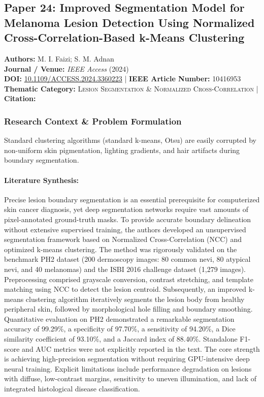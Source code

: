 \subsection{Paper 24: Improved Segmentation Model for Melanoma Lesion Detection Using Normalized Cross-Correlation-Based k-Means Clustering}
\label{sec:paper_24}

\begin{tcolorbox}[colback=gray!5!white,colframe=gray!75!black,title=\textbf{Metadata \& Citation Summary}]
\textbf{Authors:} M. I. Faizi; S. M. Adnan \\
\textbf{Journal / Venue:} \textit{IEEE Access} (2024) \\
\textbf{DOI:} \href{https://doi.org/10.1109/ACCESS.2024.3360223}{10.1109/ACCESS.2024.3360223} \quad | \quad \textbf{IEEE Article Number:} 10416953 \\
\textbf{Thematic Category:} \textsc{Lesion Segmentation \& Normalized Cross-Correlation} \quad | \quad \textbf{Citation:} \cite{10416953}
\end{tcolorbox}

\subsubsection*{Research Context \& Problem Formulation}
Standard clustering algorithms (standard k-means, Otsu) are easily corrupted by non-uniform skin pigmentation, lighting gradients, and hair artifacts during boundary segmentation.

\paragraph{Literature Synthesis:} Precise lesion boundary segmentation is an essential prerequisite for computerized skin cancer diagnosis, yet deep segmentation networks require vast amounts of pixel-annotated ground-truth masks. To provide accurate boundary delineation without extensive supervised training, the authors developed an unsupervised segmentation framework based on Normalized Cross-Correlation (NCC) and optimized k-means clustering. The method was rigorously validated on the benchmark PH2 dataset (200 dermoscopy images: 80 common nevi, 80 atypical nevi, and 40 melanomas) and the ISBI 2016 challenge dataset (1,279 images). Preprocessing comprised grayscale conversion, contrast stretching, and template matching using NCC to detect the lesion centroid. Subsequently, an improved k-means clustering algorithm iteratively segments the lesion body from healthy peripheral skin, followed by morphological hole filling and boundary smoothing. Quantitative evaluation on PH2 demonstrated a remarkable segmentation accuracy of 99.29\%, a specificity of 97.70\%, a sensitivity of 94.20\%, a Dice similarity coefficient of 93.10\%, and a Jaccard index of 88.40\%. Standalone F1-score and AUC metrics were not explicitly reported in the text. The core strength is achieving high-precision segmentation without requiring GPU-intensive deep neural training. Explicit limitations include performance degradation on lesions with diffuse, low-contrast margins, sensitivity to uneven illumination, and lack of integrated histological disease classification.

